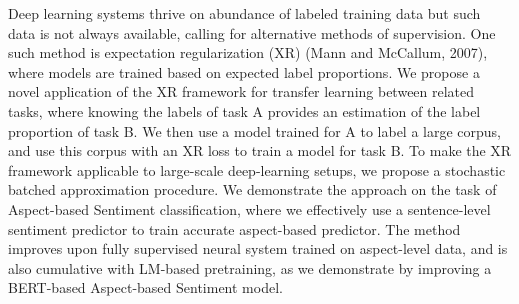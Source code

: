 Deep learning systems thrive on abundance of labeled training data but such data is not always available, calling for alternative methods of supervision. One such method is expectation regularization (XR) (Mann  and  McCallum,  2007), where models are trained based on expected label proportions. We propose a novel application of the XR framework for transfer learning between related tasks, where knowing the labels of task A provides an estimation of the label proportion of task B. We then use a model trained for A to label a large corpus, and use this corpus with an XR loss to train a model for task B. To make the XR framework applicable to large-scale deep-learning setups, we propose a stochastic batched approximation procedure. We demonstrate the approach on the task of Aspect-based Sentiment classification, where we effectively use a sentence-level sentiment predictor to train accurate aspect-based predictor. The method improves upon fully supervised neural system trained on aspect-level data, and is also cumulative with LM-based pretraining, as we demonstrate by improving a BERT-based Aspect-based Sentiment model.